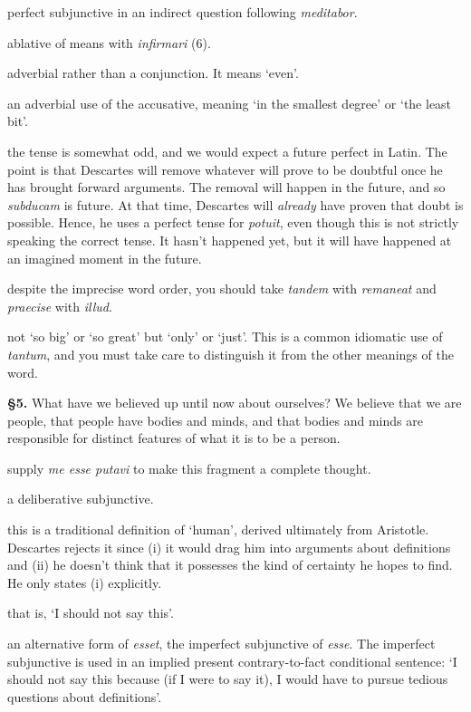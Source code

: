  perfect subjunctive in an indirect question following \textit{meditabor}.

 ablative of means with \textit{infirmari} (6).

 adverbial rather than a conjunction. It means `even'.

 an adverbial use of the accusative, meaning `in the smallest degree' or `the least bit'.

 the tense is somewhat odd, and we would expect a future perfect in Latin. The point is that Descartes will remove whatever will prove to be doubtful once he has brought forward arguments. The removal will happen in the future, and so \textit{subducam} is future. At that time, Descartes will \textit{already} have proven that doubt is possible. Hence, he uses a perfect tense for \textit{potuit}, even though this is not strictly speaking the correct tense. It hasn't happened yet, but it will have happened at an imagined moment in the future.

 despite the imprecise word order, you should take \textit{tandem} with \textit{remaneat} and \textit{praecise} with \textit{illud}.

 not `so big' or `so great' but `only' or `just'. This is a common idiomatic use of \textit{tantum}, and you must take care to distinguish it from the other meanings of the word.

\textbf{§5.} What have we believed up until now about ourselves? We believe that we are people, that people have bodies and minds, and that bodies and minds are responsible for distinct features of what it is to be a person.

 supply \textit{me esse putavi} to make this fragment a complete thought.

 a deliberative subjunctive.

 this is a traditional definition of `human', derived ultimately from Aristotle. Descartes rejects it since (i) it would drag him into arguments about definitions and (ii) he doesn't think that it possesses the kind of certainty he hopes to find. He only states (i) explicitly.

 that is, `I should not say this'.

 an alternative form of \textit{esset}, the imperfect subjunctive of \textit{esse}. The imperfect subjunctive is used in an implied present contrary-to-fact conditional sentence: `I should not say this because (if I were to say it), I would have to pursue tedious questions about definitions'.

